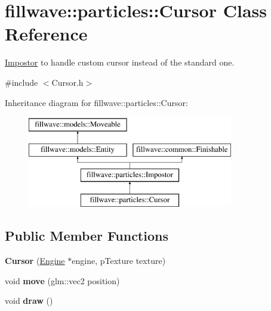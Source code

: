 \hypertarget{classfillwave_1_1particles_1_1Cursor}{}\section{fillwave\+:\+:particles\+:\+:Cursor Class Reference}
\label{classfillwave_1_1particles_1_1Cursor}


\hyperlink{classfillwave_1_1particles_1_1Impostor}{Impostor} to handle custom cursor instead of the standard one.  




{\ttfamily \#include $<$Cursor.\+h$>$}

Inheritance diagram for fillwave\+:\+:particles\+:\+:Cursor\+:\begin{figure}[H]
\begin{center}
\leavevmode
\includegraphics[height=4.000000cm]{classfillwave_1_1particles_1_1Cursor}
\end{center}
\end{figure}
\subsection*{Public Member Functions}
\begin{DoxyCompactItemize}
\item 
\hypertarget{classfillwave_1_1particles_1_1Cursor_a0ebc166e519fc14f589b2616c46cfa65}{}{\bfseries Cursor} (\hyperlink{classfillwave_1_1Engine}{Engine} $\ast$engine, p\+Texture texture)\label{classfillwave_1_1particles_1_1Cursor_a0ebc166e519fc14f589b2616c46cfa65}

\item 
\hypertarget{classfillwave_1_1particles_1_1Cursor_abc656ac436d96f3292bdd70698e1e262}{}void {\bfseries move} (glm\+::vec2 position)\label{classfillwave_1_1particles_1_1Cursor_abc656ac436d96f3292bdd70698e1e262}

\item 
\hypertarget{classfillwave_1_1particles_1_1Cursor_af80784f58512b6f59ef618a67d52277e}{}void {\bfseries draw} ()\label{classfillwave_1_1particles_1_1Cursor_af80784f58512b6f59ef618a67d52277e}

\end{DoxyCompactItemize}
